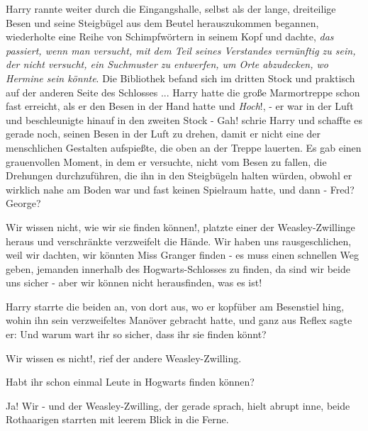 Harry rannte weiter durch die Eingangshalle, selbst als der lange, dreiteilige
Besen und seine Steigbügel aus dem Beutel herauszukommen begannen, wiederholte
eine Reihe von Schimpfwörtern in seinem Kopf und dachte, \emph{das passiert,
wenn man versucht, mit dem Teil seines Verstandes vernünftig zu sein, der nicht
versucht, ein Suchmuster zu entwerfen, um Orte abzudecken, wo Hermine sein
könnte}. Die Bibliothek befand sich im dritten Stock und praktisch auf der
anderen Seite des Schlosses ... Harry hatte die große Marmortreppe schon fast
erreicht, als er den Besen in der Hand hatte und \glqq{}\emph{Hoch}!\grqq{}, - er
war in der Luft und beschleunigte hinauf in den zweiten Stock - \glqq{}
Gah!\grqq{} schrie Harry und schaffte es gerade noch, seinen Besen in der Luft
zu drehen, damit er nicht eine der menschlichen Gestalten aufspießte, die oben
an der Treppe lauerten. Es gab einen grauenvollen Moment, in dem er versuchte,
nicht vom Besen zu fallen, die Drehungen durchzuführen, die ihn in den
Steigbügeln halten würden, obwohl er wirklich nahe am Boden war und fast keinen
Spielraum hatte, und dann - \glqq{}Fred? George?\grqq{}

\glqq{}Wir wissen nicht, wie wir sie finden können!\grqq{}, platzte einer der
Weasley-Zwillinge heraus und verschränkte verzweifelt die Hände. \glqq{}Wir haben
uns rausgeschlichen, weil wir dachten, wir könnten Miss Granger finden - es muss
einen schnellen Weg geben, jemanden innerhalb des Hogwarts-Schlosses zu finden,
da sind wir beide uns sicher - aber wir können nicht herausfinden, was es
ist!\grqq{}

Harry starrte die beiden an, von dort aus, wo er kopfüber am Besenstiel hing,
wohin ihn sein verzweifeltes Manöver gebracht hatte, und ganz aus Reflex sagte
er: \glqq{}Und warum wart ihr so sicher, dass ihr sie finden könnt?\grqq{}

\glqq{}Wir wissen es nicht!\grqq{}, rief der andere Weasley-Zwilling.

\glqq{}Habt ihr schon einmal Leute in Hogwarts finden können?\grqq{}

\glqq{}Ja! Wir -\grqq{} und der Weasley-Zwilling, der gerade sprach, hielt abrupt
inne, beide Rothaarigen starrten mit leerem Blick in die Ferne.

